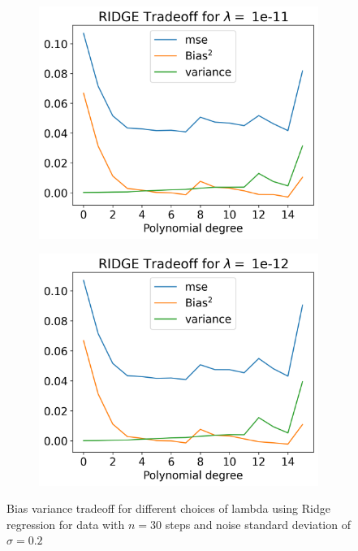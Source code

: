 \documentclass[12pt]{article}
\begin{document}
\begin{figure}[H]
\begin{subfigure}{.5\textwidth}
    \centering
    \includegraphics[width=\textwidth]{../figures/tradeoff_RIDGE_1e-11.png}
    \caption{}
    \label{fig:l_1e-11}
  \end{subfigure}
  \begin{subfigure}{.5\textwidth}
    \centering
    \includegraphics[width=\textwidth]{../figures/tradeoff_RIDGE_1e-12.png}
    \caption{}
    \label{fig:l_1e-12}
  \end{subfigure}
  \caption{Bias variance tradeoff for different choices of lambda using Ridge regression for data with $n=30$ steps and noise standard deviation of $\sigma=0.2$}
  \label{fig:ridge_tradeoff}
\end{figure}
\end{document}
